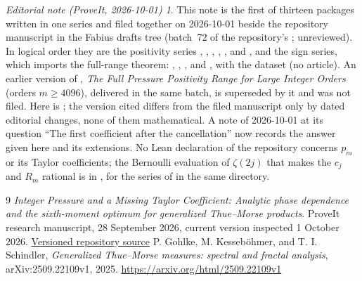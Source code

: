 \documentclass[11pt,a4paper]{article}
\theoremstyle{remark}\newtheorem*{ednote}{Editorial note (ProveIt, 2026-10-01)}
\begin{document}
\begin{ednote}
This note is the first of thirteen packages written in one series and filed together on 2026-10-01 beside the repository manuscript  in the Fabius drafts tree (batch~72 of the repository's ; unreviewed). In logical order they are the positivity series , , , , ,  and , and the sign series, which imports the full-range theorem: , , ,  and , with the dataset  (no article). An earlier version of , \emph{The Full Pressure Positivity Range for Large Integer Orders} (orders $m\ge4096$), delivered in the same batch, is superseded by it and was not filed.
Here \cite{integer} is ; the version cited differs from the filed manuscript only by dated editorial changes, none of them mathematical. A note of 2026-10-01 at its question
``The first coefficient after the cancellation'' now records the answer given here and its
extensions. No Lean declaration of the repository concerns $p_m$ or its Taylor coefficients;
the Bernoulli evaluation of $\zeta(2j)$ that makes the $c_j$ and $R_m$ rational is
 in
, for the series
 of  in the same directory.
\end{ednote}
\begin{thebibliography}{9}\small
{} \emph{Integer Pressure and a Missing Taylor Coefficient: Analytic phase dependence and the sixth-moment optimum for generalized Thue--Morse products}. ProveIt research manuscript, 28 September 2026, current version inspected 1 October 2026.\newline
\href{https://github.com/VladimirReshetnikov/ProveIt/blob/6a98f89bac85cc6b4ba5d5c3b63996037d9824e1/Analysis/FabiusFunction/docs/semi-formalized-research-frontiers/drafts/thue-morse/Thue_Morse_Integer_Pressure/article.tex}{Versioned repository source}
 P. Gohlke, M. Kesseb\"ohmer, and T. I. Schindler, \emph{Generalized Thue--Morse measures: spectral and fractal analysis}, arXiv:2509.22109v1, 2025.\newline
\url{https://arxiv.org/html/2509.22109v1}
\end{thebibliography}
\end{document}
